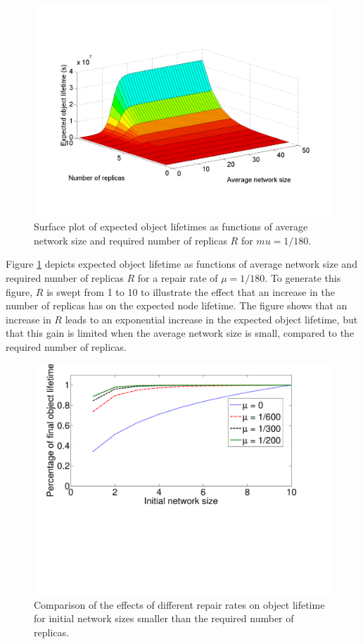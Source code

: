 \documentclass[10pt,a4paper,conference]{IEEEtran}
\begin{document}
\begin{figure}[htbp]
 \centering
 \includegraphics[clip=true, viewport=2.5cm 1.0cm 27.5cm 19.15cm, width=\columnwidth]{lifetime_replicas_av_groupsize}
 \caption{Surface plot of expected object lifetimes as functions of average network size and required number of replicas $R$ for $mu = 1/180$.}
 \label{fig_lifetime_average_vs_replicas}
\end{figure}

Figure \ref{fig_lifetime_average_vs_replicas} depicts expected object lifetime as functions of average network size and required number of replicas $R$ for a repair rate of $\mu = 1/180$. To generate this figure, $R$ is swept from 1 to 10 to illustrate the effect that an increase in the number of replicas has on the expected node lifetime. The figure shows that an increase in $R$ leads to an exponential increase in the expected object lifetime, but that this gain is limited when the average network size is small, compared to the required number of replicas.

\begin{figure}[htbp]
 \centering
 \includegraphics[clip=true, viewport=1.0cm 6.5cm 24.7cm 22.0cm, width=0.9\columnwidth]{lifetime_replication_repair}
 \caption{Comparison of the effects of different repair rates on object lifetime for initial network sizes smaller than the required number of replicas.}
 \label{fig_lifetime_replication_effect_on_initial}
\end{figure}
\end{document}

